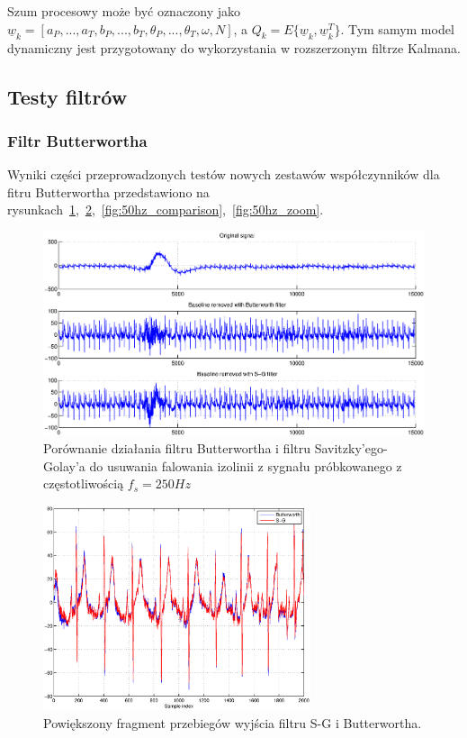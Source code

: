 Szum procesowy może być oznaczony jako $\underline{w}_k = \left[ a_P,...,a_T,b_P,...,b_T, \theta_P,...,\theta_T,\omega,N \right]$, a $Q_k = E \{\underline{w}_k, \underline{w}_k^T \}$. Tym samym model dynamiczny jest przygotowany do wykorzystania w rozszerzonym filtrze Kalmana.

\subsection{Testy filtrów}

\subsubsection{Filtr Butterwortha}

Wyniki części przeprowadzonych testów nowych zestawów współczynników dla fitru Butterwortha przedstawiono na rysunkach~\ref{fig:bw_removal_comparison},~\ref{fig:bw_removal_zoom},~\ref{fig:50hz_comparison},~\ref{fig:50hz_zoom}.

\begin{figure}[H]
\centering
	\includegraphics[width=\textwidth]{ECG_BASELINE/figures/250_baseline_comparison.eps}
\caption{Porównanie działania filtru Butterwortha i filtru Savitzky'ego-Golay'a do usuwania falowania izolinii z sygnału próbkowanego z częstotliwością $f_s=250 Hz$}
\label{fig:bw_removal_comparison}
\end{figure}

\begin{figure}[H]
\centering
	\includegraphics[width=0.7\textwidth]{ECG_BASELINE/figures/zoom_butter_sg.eps}
\caption{Powiększony fragment przebiegów wyjścia filtru S-G i Butterwortha.}
\label{fig:bw_removal_zoom}
\end{figure}

